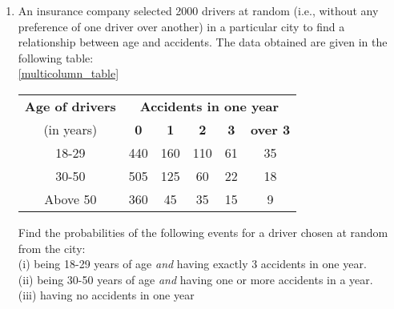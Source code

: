 \renewcommand{\theequation}{\theenumi}
\begin{enumerate}[label=\arabic*.,ref=\thesubsection.\theenumi]
\item An insurance company selected 2000 drivers at random (i.e., without
any preference of one driver over another) in a particular city to find a relationship between age and accidents. The data obtained are given in the following table:\\
\ref{multicolumn_table}
\begin{table}[!ht]
	\centering
	\begin{tabular}{|c|c|c|c|c|c|}
		\hline
		\textbf{Age of drivers} &\multicolumn{5}{c|}{\textbf{Accidents in one year }}\\
		\cline{2-6}
		(in years) &\textbf{0} &\textbf{1} &\textbf{2} &\textbf{3} &\textbf{over 3}\\
		\hline
		18-29 &440 &160 &110 &61 &35\\
		\hline
		30-50 &505 &125 &60 &22 &18\\
		\hline
		Above 50 &360 &45 &35 &15 &9\\
		\hline
	\end{tabular}
	
\end{table}

Find the probabilities of the following events for a driver chosen at random from the city:\\
(i) being 18-29 years of age \textit{and} having exactly 3 accidents in one year.\\
(ii) being 30-50 years of age \textit{and} having one or more accidents in a year.\\
(iii) having no accidents in one year
\end{enumerate}